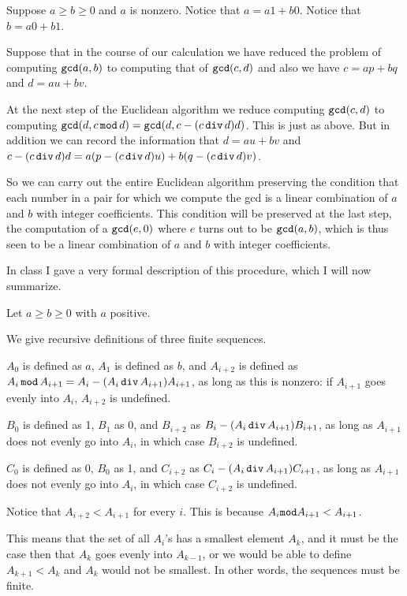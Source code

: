\documentclass[12pt]{article}
\begin{document}
Suppose $a\geq b \geq 0$ and $a$ is nonzero.  Notice that $a=a1+b0$.  Notice that $b=a0+b1$.

Suppose that in the course of our calculation we have reduced the problem of computing ${\tt gcd}(a,b)$
to computing that of ${\tt gcd}(c,d)$ and also we have $c=ap+bq$ and $d=au+bv$.

At the next step of the Euclidean algorithm we reduce computing ${\tt gcd}(c,d)$ to computing
${\tt gcd}(d,c \,{\tt mod}\,d) = {\tt gcd}(d,c-(c\,{\tt div}\,d)d)$.  This is just as above.   But in addition we
can record the information that $d=au+bv$ and $c-(c\,{\tt div}\,d)d=a(p-(c\,{\tt div}\,d)u)+b(q-(c\,{\tt div}\,d)v)$.

So we can carry out the entire Euclidean algorithm preserving the condition that each number in a pair for which
we compute the gcd is a linear combination of $a$ and $b$ with integer coefficients.  This condition will be preserved
at the last step, the computation of a ${\tt gcd}(e,0)$ where $e$ turns out to be ${\tt gcd}(a,b)$, which is thus seen to be a linear combination of $a$ and $b$ with integer coefficients.

In class I gave a very formal description of this procedure, which I will now summarize.

Let $a \geq b \geq 0$ with $a$ positive.

We give recursive definitions of three finite sequences.

$A_0$ is defined as $a$, $A_1$ is defined as $b$, and $A_{i+2}$ is defined as $A_i \,{\tt mod}\, A_{i+1} = A_i - (A_i \,{\tt div}\, A_{i+1})A_{i+1}$, as long as this is nonzero:
if $A_{i+1}$ goes evenly into $A_i$, $A_{i+2}$ is undefined.

$B_0$ is defined as 1, $B_1$ as 0, and $B_{i+2}$ as $B_i - (A_i \,{\tt div}\, A_{i+1})B_{i+1}$, as long as $A_{i+1}$ does not evenly go into $A_i$, in which case
$B_{i+2}$ is undefined.

$C_0$ is defined as 0, $B_0$ as 1, and $C_{i+2}$ as $C_i - (A_i \,{\tt div}\, A_{i+1})C_{i+1}$, as long as $A_{i+1}$ does not evenly go into $A_i$, in which case
$C_{i+2}$ is undefined.

Notice that $A_{i+2} < A_{i+1}$ for every $i$.  This is because $A_i{\tt mod}A_{i+1} < A_{i+1}$.

This means that the set of all $A_i$'s has a smallest element $A_k$, and it must be the case then that $A_k$ goes evenly into $A_{k-1}$, or we would be able to
define $A_{k+1}<A_k$ and $A_k$ would not be smallest.  In other words, the sequences must be finite.
\end{document}
